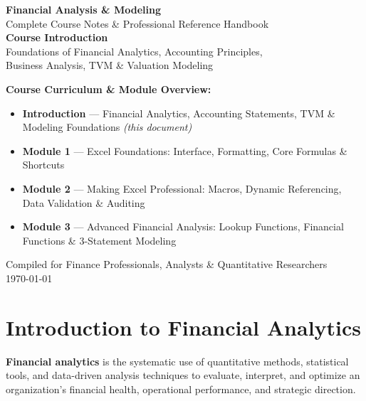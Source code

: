 \documentclass[11pt,a4paper]{article}
\begin{document}
\begin{titlepage}
\centering
\vspace*{1.5cm}
{\Huge\bfseries\color{excelgreen} Financial Analysis \& Modeling}\\[0.4cm]
{\Large Complete Course Notes \& Professional Reference Handbook}\\[1.2cm]
{\huge\bfseries Course Introduction}\\[0.3cm]
{\LARGE Foundations of Financial Analytics, Accounting Principles,\\ Business Analysis, TVM \& Valuation Modeling}\\[2cm]

\begin{tcolorbox}[colback=excelgreenlight, colframe=excelgreen, width=0.85\textwidth, arc=3pt]
\textbf{Course Curriculum \& Module Overview:}
\begin{itemize}[leftmargin=1.5em]
  \item \textbf{Introduction} --- Financial Analytics, Accounting Statements, TVM \& Modeling Foundations \textit{(this document)}
  \item \textbf{Module 1} --- Excel Foundations: Interface, Formatting, Core Formulas \& Shortcuts
  \item \textbf{Module 2} --- Making Excel Professional: Macros, Dynamic Referencing, Data Validation \& Auditing
  \item \textbf{Module 3} --- Advanced Financial Analysis: Lookup Functions, Financial Functions \& 3-Statement Modeling
\end{itemize}
\end{tcolorbox}

\vfill
{\small\textcolor{rulegray}{Compiled for Finance Professionals, Analysts \& Quantitative Researchers}}\\[0.2cm]
{\small\textcolor{rulegray}{\today}}
\end{titlepage}

\tableofcontents
\newpage

\section{Introduction to Financial Analytics}
\label{sec:intro-analytics}

\textbf{Financial analytics} is the systematic use of quantitative methods, statistical tools, and data-driven analysis techniques to evaluate, interpret, and optimize an organization's financial health, operational performance, and strategic direction.
\end{document}
